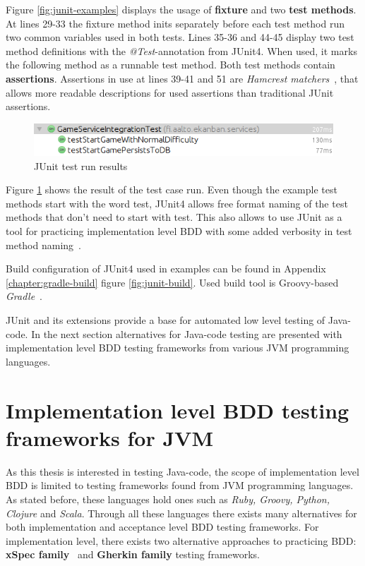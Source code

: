     Figure \ref{fig:junit-examples} displays the usage of \textbf{fixture} and two \textbf{test methods}. At lines 29-33 the fixture method
    inits separately before each test method run two common variables used in both tests. Lines 35-36 and 44-45 display two test method definitions with the
    \textit{@Test}-annotation from JUnit4. When used, it marks the following method as a runnable test method. Both test methods
    contain \textbf{assertions}. Assertions in use at lines 39-41 and 51 are \textit{Hamcrest matchers}~\cite{hamcrest}, that
    allows more readable descriptions for used assertions than traditional JUnit assertions.

    \begin{figure}[ht]
      \begin{center}
        \includegraphics[width=12.5cm]{images/junit-result.png}
        \caption{JUnit test run results}
        \label{fig:junit-result}
      \end{center}
    \end{figure}

    Figure \ref{fig:junit-result} shows the result of the test case run. Even though the example test methods start with the word test,
    JUnit4 allows free format naming of the test methods that don't need to start with test. This also allows to use JUnit as a tool for practicing
    implementation level BDD with some added verbosity in test method naming~\cite{smart2014bdd}.

    Build configuration of JUnit4 used in examples can be found in Appendix \ref{chapter:gradle-build} figure \ref{fig:junit-build}.
    Used build tool is Groovy-based \textit{Gradle}~\cite{gradle}.

    JUnit and its extensions provide a base for automated low level testing of Java-code.
    In the next section alternatives for Java-code testing are presented with implementation level BDD testing frameworks from
    various JVM programming languages.

\section{Implementation level BDD testing frameworks for JVM}
    As this thesis is interested in testing Java-code, the scope of implementation level BDD is limited to testing frameworks
    found from JVM programming languages. As stated before, these languages hold ones such as \textit{Ruby, Groovy, Python,
    Clojure} and \textit{Scala}. Through all these languages there exists many alternatives for both implementation and
    acceptance level BDD testing frameworks. For implementation level, there exists two alternative approaches to practicing
    BDD: \textbf{xSpec family}~\cite{solis2011study} and \textbf{Gherkin family} testing frameworks.

